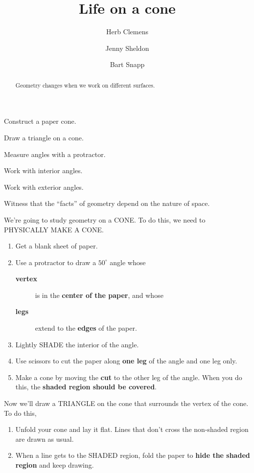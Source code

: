 \documentclass[nooutcomes,noauthor,handout]{ximera}
\title{Life on a cone}
\author{Herb Clemens \and Jenny Sheldon \and Bart Snapp}
\begin{document}
\begin{abstract}
  Geometry changes when we work on different surfaces.
\end{abstract}
\maketitle


\begin{listOutcomes}
\item Construct a paper cone.
\item Draw a triangle on a cone.
\item Measure angles with a protractor.
\item Work with interior angles.
\item Work with exterior angles.
\item Witness that the ``facts'' of geometry depend on the nature of
  space.
\end{listOutcomes}

We're going to study geometry on a CONE. To do this, we need to
PHYSICALLY MAKE A CONE.

\begin{enumerate}
\item Get a blank sheet of paper.
\item Use a protractor to draw a $50^\circ$ angle whose
  \begin{description}
    \item[\textbf{vertex}] is in the \textbf{center of the paper}, and whose
    \item[\textbf{legs}] extend to the \textbf{edges} of the paper.
  \end{description}
  \item Lightly SHADE the interior of the angle.
  \item Use scissors to cut the paper along \textbf{one leg} of the
    angle and one leg only.
  \item Make a cone by moving the \textbf{cut} to the other leg of the
    angle. When you do this, the \textbf{shaded region should be covered}.
\end{enumerate}

Now we'll draw a TRIANGLE on the cone that surrounds the vertex of the
cone. To do this,
\begin{enumerate}
\item Unfold your cone and lay it flat. Lines that don't cross the
  non-shaded region are drawn as usual.
\item When a line gets to the SHADED region, fold the paper to \textbf{hide
  the shaded region} and keep drawing.
\end{enumerate}
\end{document}
